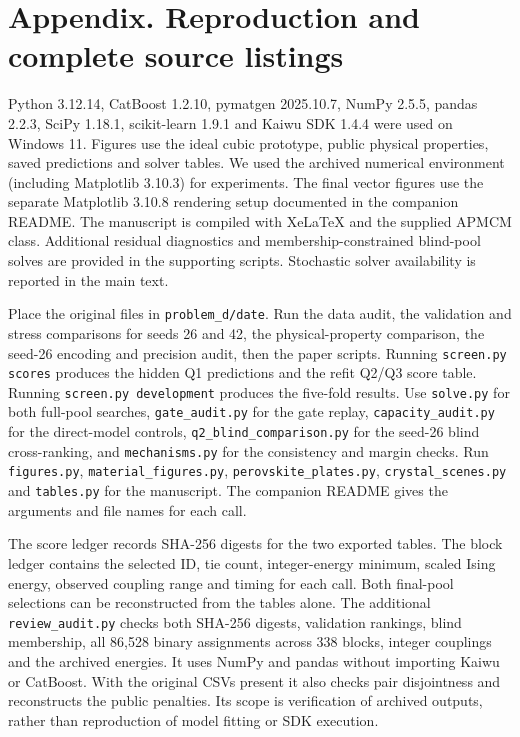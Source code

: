 \clearpage
\section*{Appendix. Reproduction and complete source listings}
{}
Python 3.12.14, CatBoost 1.2.10, pymatgen 2025.10.7, NumPy 2.5.5, pandas 2.2.3, SciPy 1.18.1, scikit-learn 1.9.1 and Kaiwu SDK 1.4.4 were used on Windows 11. Figures use the ideal cubic prototype, public physical properties, saved predictions and solver tables. We used the archived numerical environment (including Matplotlib 3.10.3) for experiments. The final vector figures use the separate Matplotlib 3.10.8 rendering setup documented in the companion README. The manuscript is compiled with XeLaTeX and the supplied APMCM class. Additional residual diagnostics and membership-constrained blind-pool solves are provided in the supporting scripts. Stochastic solver availability is reported in the main text.

Place the original files in \texttt{problem\_d/date}. Run the data audit, the validation and stress comparisons for seeds 26 and 42, the physical-property comparison, the seed-26 encoding and precision audit, then the paper scripts. Running \texttt{screen.py scores} produces the hidden Q1 predictions and the refit Q2/Q3 score table. Running \texttt{screen.py development} produces the five-fold results. Use \texttt{solve.py} for both full-pool searches, \texttt{gate\_audit.py} for the gate replay, \texttt{capacity\_audit.py} for the direct-model controls, \texttt{q2\_blind\_comparison.py} for the seed-26 blind cross-ranking, and \texttt{mechanisms.py} for the consistency and margin checks. Run \texttt{figures.py}, \texttt{material\_figures.py}, \texttt{perovskite\_plates.py}, \texttt{crystal\_scenes.py} and \texttt{tables.py} for the manuscript. The companion README gives the arguments and file names for each call.

The score ledger records SHA-256 digests for the two exported tables. The block ledger contains the selected ID, tie count, integer-energy minimum, scaled Ising energy, observed coupling range and timing for each call. Both final-pool selections can be reconstructed from the tables alone. The additional \texttt{review\_audit.py} checks both SHA-256 digests, validation rankings, blind membership, all 86,528 binary assignments across 338 blocks, integer couplings and the archived energies. It uses NumPy and pandas without importing Kaiwu or CatBoost. With the original CSVs present it also checks pair disjointness and reconstructs the public penalties. Its scope is verification of archived outputs, rather than reproduction of model fitting or SDK execution.

